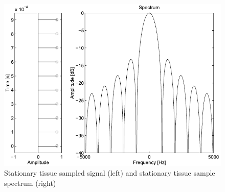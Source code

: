 \begin{figure}[htbp]
	\centering
	\includegraphics[width=.8\textwidth]{Figures/2_rf_spectrum_stationary.pdf}
	\caption[Stationary tissue sampled signal and stationary tissue sample spectrum]{Stationary tissue sampled signal (left) and stationary tissue sample spectrum (right) \cite{JensenUltrasoundBook}}
	\label{fig:2_rf_spectrum_stationary}
\end{figure}

